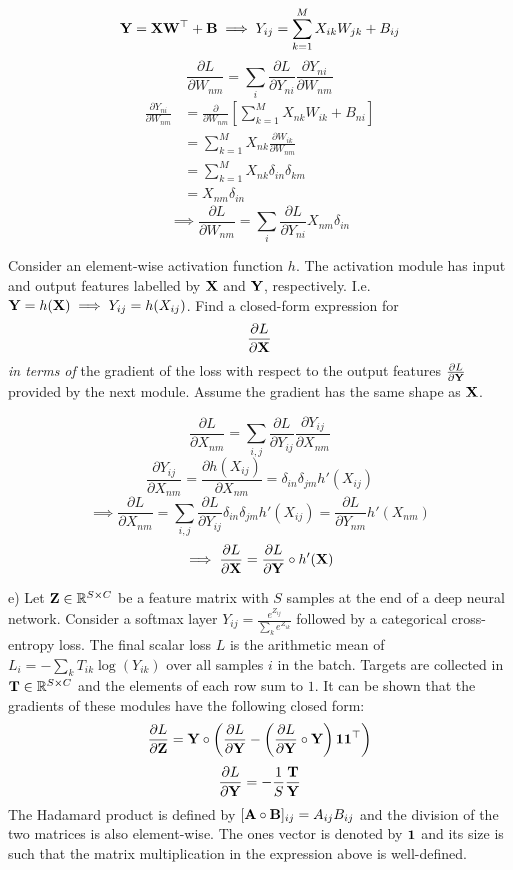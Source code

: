 \documentclass[a4paper]{article}
\newcommand{\R}{\mathbb{R}}
\newcommand{\1}{\mathbbm{1}}
\renewcommand{\l}{\left}
\renewcommand{\r}{\right}
\newcommand{\<}{\langle}
\renewcommand{\>}{\rangle}
\newcommand{\p}[1]{\frac{\partial}{\partial #1}}
\newcommand{\pp}[2]{\frac{\partial #1}{\partial #2}}
\newcommand{\bs}{\boldsymbol}
\begin{document}
\begin{ans}
$$\bold Y = \bold X \bold W^\top + \bold B \implies Y_{ij} = \sum_{k=1}^M X_{ik} W_{jk} + B_{ij}$$
$$\pp{L}{W_{nm}} = \sum_i \pp{L}{Y_{ni}} \pp{Y_{ni}}{W_{nm}}$$
\begin{align*}
\pp{Y_{ni}}{W_{nm}} &= \p{W_{nm}} \l[ \sum_{k=1}^M X_{nk} W_{ik} + B_{ni} \r] \\
&= \sum_{k=1}^M X_{nk} \pp{W_{ik}}{W_{nm}} \\
&= \sum_{k=1}^M X_{nk} \delta_{in} \delta_{km} \\
&= X_{nm} \delta_{in}
\end{align*}
$$\implies \pp{L}{W_{nm}} = \sum_i \pp{L}{Y_{ni}} X_{nm} \delta_{in}$$
\end{ans}

\newpage
Consider an element-wise activation function $h$. The activation module has input and output features labelled by $\bold X$ and $\bold Y$, respectively. I.e. $\bold Y = h(\bold X) \implies Y_{ij} = h(X_{ij})$. Find a closed-form expression for
$$\pp{L}{\bold X}$$
\emph{in terms of} the gradient of the loss with respect to the output features $\pp{L}{\bold Y}$ provided by the next module. Assume the gradient has the same shape as $\bold X$.

\begin{ans}[Solution]
$$\pp{L}{X_{nm}} = \sum_{i,j} \pp{L}{Y_{ij}} \pp{Y_{ij}}{X_{nm}}$$
$$\pp{Y_{ij}}{X_{nm}} = \pp{h(X_{ij})}{X_{nm}} = \delta_{in} \delta_{jm} h'(X_{ij})$$
$$\implies \pp{L}{X_{nm}} = \sum_{i,j} \pp{L}{Y_{ij}} \delta_{in} \delta_{jm} h'(X_{ij}) = \pp{L}{Y_{nm}} h'(X_{nm})$$
$$\implies \pp{L}{\bold X} = \pp{L}{\bold Y} \circ h'(\bold X)$$
\end{ans}

e) Let $\bold Z \in \R^{S \times C}$ be a feature matrix with $S$ samples at the end of a deep neural network. Consider a softmax layer $Y_{ij} = \frac{e^{Z_{ij}}}{\sum_k e^{Z_{ik}}}$ followed by a categorical cross-entropy loss. The final scalar loss $L$ is the arithmetic mean of $L_i = - \sum_k T_{ik} \log(Y_{ik})$ over all samples $i$ in the batch. Targets are collected in $\bold T \in \R^{S \times C}$ and the elements of each row sum to $1$. It can be shown that the gradients of these modules have the following closed form:
$$\pp{L}{\bold Z} = \bold Y \circ \l( \pp{L}{\bold Y} - \l( \pp{L}{\bold Y} \circ \bold Y \r) \bs1 \bs1^\top \r)$$
$$\pp{L}{\bold Y} = -\frac1S \frac{\bold T}{\bold Y}$$
The Hadamard product is defined by $[\bold A \circ \bold B]_{ij} = A_{ij} B_{ij}$ and the division of the two matrices is also element-wise. The ones vector is denoted by $\bold 1$ and its size is such that the matrix multiplication in the expression above is well-defined.
\end{document}

